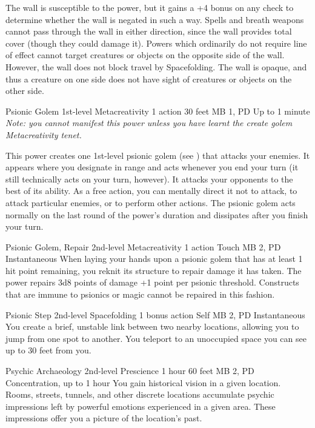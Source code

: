 The wall is susceptible to the  power,
but it gains a +4 bonus on any check
to determine whether the wall is negated in such a way.
Spells and breath weapons cannot pass through the wall
in either direction,
since the wall provides total cover
(though they could damage it).
Powers which ordinarily do not require line of effect
cannot target creatures or objects
on the opposite side of the wall.
However, the wall does not block travel by Spacefolding.
The wall is opaque, and thus a creature on one side does not have
sight of creatures or objects on the other side.

\DndPowerHeader%
  {Psionic Golem}
  {1st-level Metacreativity}
  {1 action}
  {30 feet}
  {MB 1, PD \lvlone}
  {Up to 1 minute}
\textit{Note: you cannot manifest this power unless
you have learnt the create golem Metacreativity tenet.}

This power creates one 1st-level psionic golem
(see )
that attacks your enemies.
It appears where you designate in range and acts
whenever you end your turn
(it still technically acts on your turn, however).
It attacks your opponents to the best of its ability.
As a free action,
you can mentally direct it not to attack,
to attack particular enemies,
or to perform other actions.
The psionic golem acts normally on the last round
of the power's duration
and dissipates after you finish your turn.

\DndPowerHeader%
  {Psionic Golem, Repair}
  {2nd-level Metacreativity}
  {1 action}
  {Touch}
  {MB 2, PD \lvltwo}
  {Instantaneous}
When laying your hands upon a psionic golem
that has at least 1 hit point remaining,
you reknit its structure to repair damage it has taken.
The power repairs 3d8 points of damage
+1 point per psionic threshold.
Constructs that are immune to psionics or magic
cannot be repaired in this fashion.

\DndPowerHeader%
  {Psionic Step}
  {2nd-level Spacefolding}
  {1 bonus action}
  {Self}
  {MB 2, PD \lvltwo}
  {Instantaneous}
You create a brief, unstable link between two nearby locations,
allowing you to jump from one spot to another.
You teleport to an unoccupied space you can see
up to 30 feet from you.

\DndPowerHeader%
  {Psychic Archaeology}
  {2nd-level Prescience}
  {1 hour}
  {60 feet}
  {MB 2, PD \lvltwo}
  {Concentration, up to 1 hour}
You gain historical vision in a given location.
Rooms, streets, tunnels, and other discrete locations
accumulate psychic impressions left by powerful emotions
experienced in a given area.
These impressions offer you a picture of the location's past.

